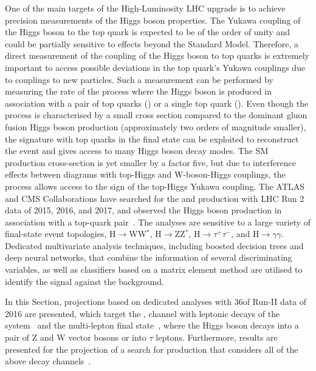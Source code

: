 

One of the main targets of the High-Luminosity LHC upgrade is to achieve precision measurements of the Higgs boson properties.
The Yukawa coupling of the Higgs boson to the top quark is expected to be of the order of unity and could be partially sensitive to effects beyond the Standard Model.
Therefore, a direct measurement of the coupling of the Higgs boson to top quarks is extremely important to access possible deviations in the top quark's Yukawa couplings due to couplings to new particles.
Such a measurement can be performed by measuring the rate of the process where the Higgs boson is produced in association with a pair of top quarks (\ttH) or a single top quark (\tH).
Even though the \ttH process is characterised by a small cross section compared to the dominant gluon fusion Higgs boson production (approximately two orders of magnitude smaller), the signature with top quarks in the final state can be exploited to reconstruct the event and gives access to many Higgs boson decay modes.
The SM \tH production cross-section is yet smaller by a factor five, but due to interference effects between diagrams with top-Higgs and W-boson-Higgs couplings, the process allows access to the sign of the top-Higgs Yukawa coupling.
The ATLAS and CMS Collaborations have searched for the \ttH and \tH production with LHC Run 2 data of 2015, 2016, and 2017, and observed the Higgs boson production in association with a top-quark pair~\cite{Aaboud:2018urx,Sirunyan:2018hoz}.
The analyses are sensitive to a large variety of final-state event topologies, H$\rightarrow$WW$^{*}$, H$\rightarrow$ZZ$^{*}$, H$\rightarrow \tau^{+}\tau^{-}$, \Htobb and H$\rightarrow \gamma\gamma$.
Dedicated multivariate analysis techniques, including boosted decision trees and deep neural networks, that combine the information of several discriminating variables, as well as classifiers based on a matrix element method are utilised to identify the signal against the background.

In this Section, projections based on dedicated analyses with 36\fbinv of Run-II data of 2016 are presented, which target the \ttH, \Htobb channel with leptonic decays of the \ttbar system~\cite{Aaboud:2017rss,Sirunyan:2018mvw} and the \ttH multi-lepton final state~\cite{Aaboud:2017jvq}, where the Higgs boson decays into a pair of Z and W vector bosons or into $\tau$ leptons.
Furthermore, results are presented for the projection of a search for \tH production that considers all of the above decay channels~\cite{Sirunyan:2018lzm}.


